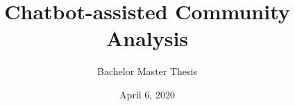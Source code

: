 \newcommand*{\BACHELOR}{}
\title{Chatbot-assisted Community Analysis}
\subtitle{\ifdefined\BACHELOR Bachelor \else Master \fi Thesis \ifdefined\PROPOSAL
		\PROPOSAL
	\fi}
\date{April 6, 2020}
\newcommand{\firstname}{Ben Aziz}
\newcommand{\lastname}{Lakhoune}
\newcommand{\matrNo}{380163}
\newcommand{\email}{ben.lakhoune@rwth-aachen.de}
\newcommand{\studyProgram}{\ifdefined\BACHELOR Bachelor \else Master \fi Computer Science}

\newcommand{\firstsupervisor}{first supervisor}
\newcommand{\firstsupervisorchair}{chair of first supervisor}
\newcommand{\firstsupervisoruniversity}{RWTH Aachen University}

\newcommand{\secondsupervisor}{second supervisor}
\newcommand{\secondsupervisorchair}{chair of second supervisor}
\newcommand{\secondsupervisoruniversity}{RWTH Aachen University}


\newcommand{\firstadvisor}{first advisor}
\newcommand{\firstadvisorchair}{chair of first advisor}
\newcommand{\firstadvisoruniversity}{RWTH Aachen University}

\newcommand{\secondadvisor}{second advisor}
\newcommand{\secondadvisorchair}{chair of second advisor}
\newcommand{\secondadvisoruniversity}{RWTH Aachen University}